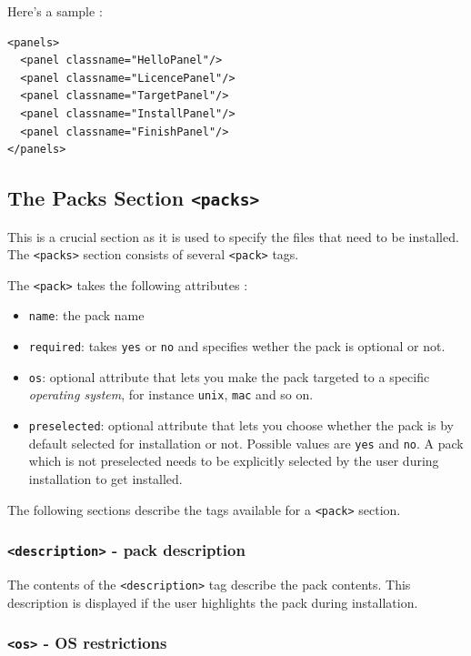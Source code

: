 Here's a sample :
\footnotesize
\begin{verbatim}
<panels>
  <panel classname="HelloPanel"/>
  <panel classname="LicencePanel"/>
  <panel classname="TargetPanel"/>
  <panel classname="InstallPanel"/>
  <panel classname="FinishPanel"/>
</panels>
\end{verbatim}
\normalsize

\subsection{The Packs Section \texttt{<packs>}}

This is a crucial section as it is used to specify the files that need
to be installed. The \texttt{<packs>} section consists of several 
\texttt{<pack>} tags.

The \texttt{<pack>} takes the following attributes :
  \begin{itemize}
    \item \texttt{name}: the pack name
    \item \texttt{required}: takes \texttt{yes} or \texttt{no} and specifies
    wether the pack is optional or not.
    \item \texttt{os}: optional attribute that lets you make the pack targeted
    to a specific \textsl{operating system}, for instance \texttt{unix},
    \texttt{mac} and so on.
    \item \texttt{preselected}: optional attribute that lets you choose whether
    the pack is by default selected for installation or not. Possible values
    are \texttt{yes} and \texttt{no}. A pack which is not preselected needs to
    be explicitly selected by the user during installation to get installed.
  \end{itemize}

The following sections describe the tags available for a \texttt{<pack>} section.

\subsubsection{\texttt{<description>} - pack description}

The contents of the \texttt{<description>} tag describe the pack contents.
This description is displayed if the user highlights the pack during 
installation.

\subsubsection{\texttt{<os>} - OS restrictions}


